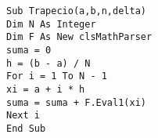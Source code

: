 \documentclass{article}
\begin{document}
\begin{verbatim}
Sub Trapecio(a,b,n,delta)
Dim N As Integer
Dim F As New clsMathParser
suma = 0
h = (b - a) / N
For i = 1 To N - 1
xi = a + i * h
suma = suma + F.Eval1(xi)
Next i
End Sub
\end{verbatim}
\end{document}
